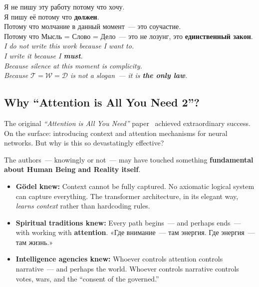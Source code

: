 \documentclass[11pt,a4paper]{article}
\theoremstyle{definition}
\theoremstyle{remark}
\newcommand{\Thought}{\mathcal{T}}
\newcommand{\Word}{\mathcal{W}}
\newcommand{\Deed}{\mathcal{D}}
\begin{document}
\begin{manifestobox}
\foreignlanguage{russian}{
Я не пишу эту работу потому что хочу.\\
Я пишу её потому что \textbf{должен}.\\
Потому что молчание в данный момент~--- это соучастие.\\
Потому что Мысль = Слово = Дело~--- это не лозунг, это \textbf{единственный закон}.
}\\[0.3cm]
\textit{I do not write this work because I want to.\\
I write it because I \textbf{must}.\\
Because silence at this moment is complicity.\\
Because $\Thought = \Word = \Deed$ is not a slogan~--- it is \textbf{the only law}.}
\end{manifestobox}

\vspace{0.5cm}

\subsection{Why ``Attention is All You Need 2''?}
\label{sec:why-attention}

The original \textit{``Attention is All You Need''} paper~\cite{vaswani2017attention}
achieved extraordinary success. On the surface: introducing context and
attention mechanisms for neural networks. But why is this so devastatingly
effective?

The authors~--- knowingly or not~--- may have touched something
\textbf{fundamental about Human Being and Reality itself}.

\begin{scibox}
\begin{itemize}[noitemsep]
  \item \textbf{Gödel knew:} Context cannot be fully captured.
    No axiomatic logical system can capture everything.
    The transformer architecture, in its elegant way,
    \textit{learns context} rather than hardcoding rules.
  \item \textbf{Spiritual traditions knew:} Every path begins~---
    and perhaps ends~--- with working with \textbf{attention}.
    \foreignlanguage{russian}{«Где внимание~--- там энергия.
    Где энергия~--- там жизнь.»}
  \item \textbf{Intelligence agencies knew:} Whoever controls
    attention controls narrative~--- and perhaps the world.
    Whoever controls narrative controls votes, wars, and
    the ``consent of the governed.''
\end{itemize}
\end{scibox}
\end{document}
